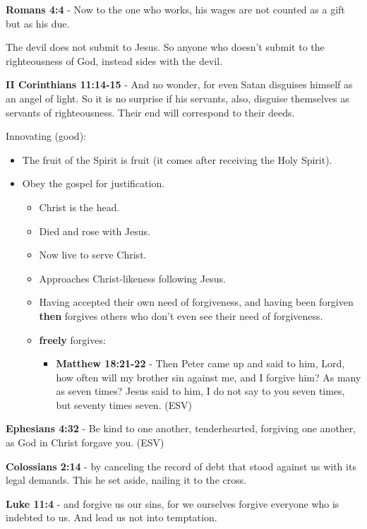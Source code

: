 \documentclass[11pt]{article}
\begin{document}
\textbf{Romans 4:4} - Now to the one who works, his wages are not counted as a gift but as his due.

The devil does not submit to Jesus. So anyone who doesn't submit to the righteousness of God, instead sides with the devil.

\textbf{II Corinthians 11:14-15} - And no wonder, for even Satan disguises himself as an angel of light. So it is no surprise if his servants, also, disguise themselves as servants of righteousness. Their end will correspond to their deeds.

Innovating (good):
\begin{itemize}
\item The fruit of the Spirit is fruit (it comes after receiving the Holy Spirit).
\item Obey the gospel for justification.
\begin{itemize}
\item Christ is the head.
\item Died and rose with Jesus.
\item Now live to serve Christ.
\item Approaches Christ-likeness following Jesus.
\item Having accepted their own need of forgiveness, and having been forgiven \textbf{then} forgives others who don't even see their need of forgiveness.
\item \textbf{freely} forgives:
\begin{itemize}
\item \textbf{Matthew 18:21-22} -  Then Peter came up and said to him, Lord, how often will my brother sin against me, and I forgive him?  As many as seven times?  Jesus said to him, I do not say to you seven times, but seventy times seven.  (ESV)
\end{itemize}
\end{itemize}
\end{itemize}

\textbf{Ephesians 4:32} - Be kind to one another, tenderhearted, forgiving one another, as God in Christ forgave you. (ESV)

\textbf{Colossians 2:14} - by canceling the record of debt that stood against us with its legal demands. This he set aside, nailing it to the cross.

\textbf{Luke 11:4} - and forgive us our sins, for we ourselves forgive everyone who is indebted to us. And lead us not into temptation.
\end{document}
